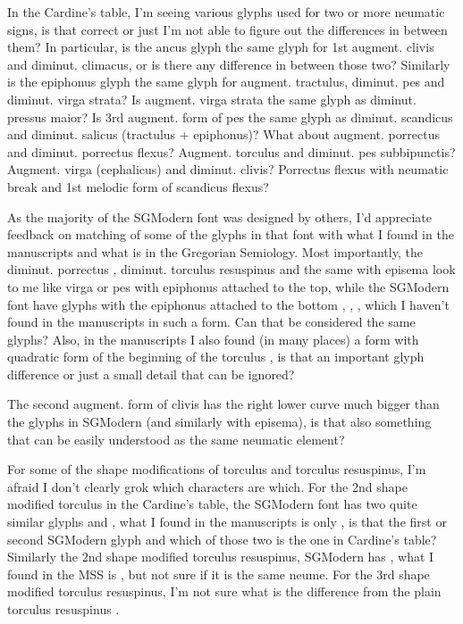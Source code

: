 \documentclass[a4paper]{article}
\begin{document}
In the Cardine's table, I'm seeing various glyphs used for two or more
neumatic signs, is that correct or just I'm not able to figure out the
differences in between them?  In particular, is the ancus glyph
\quad{} the same glyph for 1st augment. clivis and
diminut. climacus, or is there any difference in between those two?
Similarly is the epiphonus glyph \quad{}\quad the same
glyph for augment. tractulus, diminut. pes and diminut. virga strata?
Is augment. virga strata \quad{}\quad the same
glyph as diminut. pressus maior?  Is 3rd augment. form of pes
\quad{}\quad the same glyph as diminut. scandicus
and diminut. salicus (tractulus + epiphonus)?  What about augment. porrectus
\quad{}\quad and diminut. porrectus flexus?
Augment. torculus \quad{}\quad and diminut. pes
subbipunctis?  Augment. virga (cephalicus) \quad{}\quad
and diminut. clivis?  Porrectus flexus with neumatic break
\quad{}\quad and 1st melodic form
of scandicus flexus?

As the majority of the SGModern font was designed by others, I'd appreciate
feedback on matching of some of the glyphs in that font with what I found in
the manuscripts and what is in the Gregorian Semiology.  Most importantly,
the diminut. porrectus \quad, diminut. torculus resuspinus
\quad and the same with episema \quad look to me like virga or
pes with epiphonus attached to the top, while the SGModern font have
glyphs with the epiphonus attached to the bottom \quad,
\quad, \quad, which I haven't found in the
manuscripts in such a form.  Can that be considered the same glyphs?
Also, in the manuscripts I also found (in many places) a form with quadratic
form of the beginning of the torculus \quad, is that an
important glyph difference or just a small detail that can be ignored?

The second augment. form of clivis  has the right lower curve much
bigger than the glyphs in SGModern  (and similarly with episema),
is that also something that can be easily understood as the same neumatic
element?

For some of the shape modifications of torculus and torculus resuspinus, I'm
afraid I don't clearly grok which characters are which.  For the 2nd shape
modified torculus in the Cardine's table, the SGModern font has two quite
similar glyphs \quad and \quad, what I found in the
manuscripts is only \quad, is that the first or second SGModern
glyph and which of those two is the one in Cardine's table?
Similarly the 2nd shape modified torculus resuspinus, SGModern has
\quad, what I found in the MSS is \quad, but not sure
if it is the same neume.  For the 3rd shape modified torculus resuspinus,
I'm not sure what is the difference from the plain torculus resuspinus
\quad{}\quad.
\end{document}
